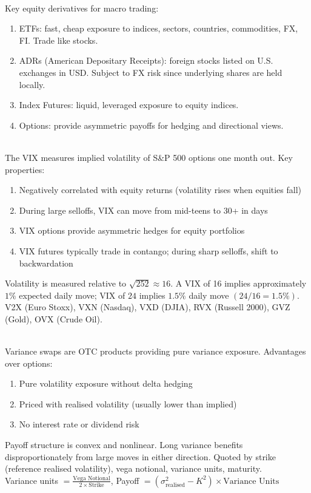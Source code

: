 \begin{remark} \\
Key equity derivatives for macro trading:
\begin{enumerate}[label=\roman*.]
\setlength{\itemsep}{0pt}
\item ETFs: fast, cheap exposure to indices, sectors, countries, commodities, FX, FI. Trade like stocks.
\item ADRs (American Depositary Receipts): foreign stocks listed on U.S. exchanges in USD. Subject to FX risk since underlying shares are held locally.
\item Index Futures: liquid, leveraged exposure to equity indices.
\item Options: provide asymmetric payoffs for hedging and directional views.
\end{enumerate}
\end{remark}

\begin{remark} \\
The VIX measures implied volatility of S\&P 500 options one month out. Key properties:
\begin{enumerate}[label=\roman*.]
\setlength{\itemsep}{0pt}
\item Negatively correlated with equity returns (volatility rises when equities fall)
\item During large selloffs, VIX can move from mid-teens to 30+ in days
\item VIX options provide asymmetric hedges for equity portfolios
\item VIX futures typically trade in contango; during sharp selloffs, shift to backwardation
\end{enumerate}
Volatility is measured relative to $\sqrt{252} \approx 16$. A VIX of 16 implies approximately $1\%$ expected daily move; VIX of $24$ implies $1.5\%$ daily move $(24/16 = 1.5\%)$.\\
V2X (Euro Stoxx), VXN (Nasdaq), VXD (DJIA), RVX (Russell 2000), GVZ (Gold), OVX (Crude Oil).
\end{remark}

\begin{remark} \\
Variance swaps are OTC products providing pure variance exposure. Advantages over options:
\begin{enumerate}[label=\roman*.]
\setlength{\itemsep}{0pt}
\item Pure volatility exposure without delta hedging
\item Priced with realised volatility (usually lower than implied)
\item No interest rate or dividend risk
\end{enumerate}
Payoff structure is convex and nonlinear. Long variance benefits disproportionately from large moves in either direction. Quoted by strike (reference realised volatility), vega notional, variance units, maturity.\\
Variance units $= \frac{\text{Vega Notional}}{2 \times \text{Strike}}$, Payoff $= (\sigma_{\text{realised}}^2 - K^2) \times \text{Variance Units}$
\end{remark}

